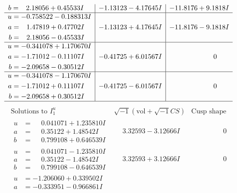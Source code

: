 \documentclass[1p]{elsarticle_modified}
\theoremstyle{definition}
\newcommand{\I}{\sqrt{-1}}
\begin{document}
$$\begin{array}{c|c|c}
\begin{aligned}
b &= \phantom{-}2.18056 + 0.45533 I\end{aligned}
 & -1.13123 - 4.17645 I & -11.8176 + 9.1818 I \\ \hline\begin{aligned}
u &= -0.758522 - 0.188313 I \\
a &= \phantom{-}1.47819 + 0.47702 I \\
b &= \phantom{-}2.18056 - 0.45533 I\end{aligned}
 & -1.13123 + 4.17645 I & -11.8176 - 9.1818 I \\ \hline\begin{aligned}
u &= -0.341078 + 1.170670 I \\
a &= -1.71012 - 0.11107 I \\
b &= -2.09658 - 0.30512 I\end{aligned}
 & -0.41725 + 6.01567 I & \phantom{-0.000000 } 0 \\ \hline\begin{aligned}
u &= -0.341078 - 1.170670 I \\
a &= -1.71012 + 0.11107 I \\
b &= -2.09658 + 0.30512 I\end{aligned}
 & -0.41725 - 6.01567 I & \phantom{-0.000000 } 0\\
 \hline 
 \end{array}$$\newpage$$\begin{array}{c|c|c}  
\text{Solutions to }I^u_{1}& \I (\text{vol} + \sqrt{-1}CS) & \text{Cusp shape}\\
 \hline 
\begin{aligned}
u &= \phantom{-}0.041071 + 1.235810 I \\
a &= \phantom{-}0.35122 + 1.48542 I \\
b &= \phantom{-}0.799108 + 0.646539 I\end{aligned}
 & \phantom{-}3.32593 - 3.12666 I & \phantom{-0.000000 } 0 \\ \hline\begin{aligned}
u &= \phantom{-}0.041071 - 1.235810 I \\
a &= \phantom{-}0.35122 - 1.48542 I \\
b &= \phantom{-}0.799108 - 0.646539 I\end{aligned}
 & \phantom{-}3.32593 + 3.12666 I & \phantom{-0.000000 } 0 \\ \hline\begin{aligned}
u &= -1.206060 + 0.339502 I \\
a &= -0.333951 - 0.966861 I \\

\end{aligned}
\end{array}$$
\end{document}
